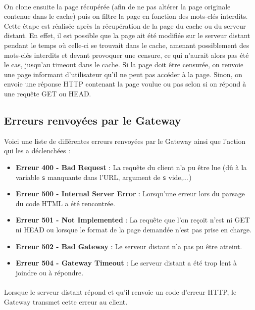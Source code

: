 \documentclass[a4paper,11pt]{article}
\begin{document}
\paragraph{}

On clone ensuite la page récupérée (afin de ne pas altérer la page originale contenue dans le cache) puis on filtre la page en fonction des mots-clés interdits. Cette étape est réalisée après la récupération de la page du cache ou du serveur distant. En effet, il est possible que la page ait été modifiée sur le serveur distant pendant le temps où celle-ci se trouvait dans le cache, amenant possiblement des mots-clés interdits et devant provoquer une censure, ce qui n'aurait alors pas été le cas, jusqu'au timeout dans le cache. Si la page doit être censurée, on renvoie une page informant d'utilisateur qu'il ne peut pas accéder à la page. Sinon, on envoie une réponse HTTP contenant la page voulue ou pas selon si on répond à une requête GET ou HEAD.



	\subsection{Erreurs renvoyées par le Gateway}
Voici une liste de différentes erreurs renvoyées par le Gateway ainsi que l'action qui les a déclenchées : 
\begin{itemize}
	\setlength{\itemsep}{6pt}
	\item \textbf{Erreur 400 - Bad Request} : La requête du client n'a pu être lue (dû à la variable \texttt{s} manquante dans l'URL, argument de \texttt{s} vide,...)
	\item \textbf{Erreur 500 - Internal Server Error} : Lorsqu'une erreur lors du parsage du code HTML a été rencontrée.
	\item \textbf{Erreur 501 - Not Implemented} : La requête que l'on reçoit n'est ni GET ni HEAD ou lorsque le format de la page demandée n'est pas prise en charge.
	\item \textbf{Erreur 502 - Bad Gateway} : Le serveur distant n'a pas pu être atteint.
	\item \textbf{Erreur 504 - Gateway Timeout} : Le serveur distant a été trop lent à joindre ou à répondre.
\end{itemize}
\paragraph{}
Lorsque le serveur distant répond et qu'il renvoie un code d'erreur HTTP, le Gateway transmet cette erreur au client.
\end{document}
